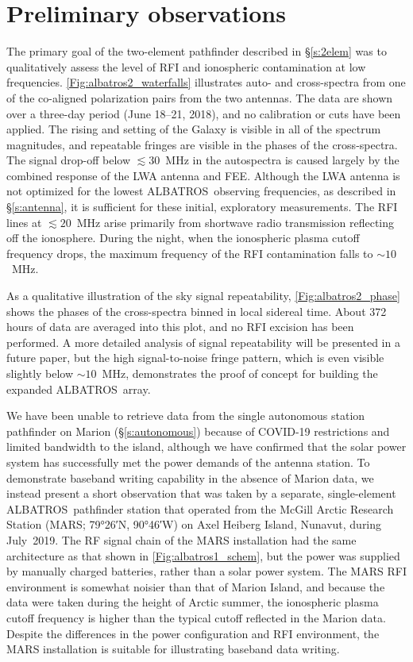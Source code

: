 \documentclass{ws-jai}
\def\albatros{ALBATROS}
\begin{document}
\section{Preliminary observations}\label{s:obs}

The primary goal of the two-element pathfinder described in
\S\ref{s:2elem} was to qualitatively assess the level of RFI and
ionospheric contamination at low frequencies.
\autoref{Fig:albatros2_waterfalls} illustrates auto- and cross-spectra
from one of the co-aligned polarization pairs from the two antennas.
The data are shown over a three-day period (June 18--21, 2018), and no
calibration or cuts have been applied.  The rising and setting of the
Galaxy is visible in all of the spectrum magnitudes, and repeatable
fringes are visible in the phases of the cross-spectra.  The signal
drop-off below $\lesssim30$~MHz in the autospectra is caused largely
by the combined response of the LWA antenna and FEE.  Although the LWA
antenna is not optimized for the lowest \albatros\ observing
frequencies, as described in \S\ref{s:antenna}, it is sufficient for
these initial, exploratory measurements.  The RFI lines at
$\lesssim20$~MHz arise primarily from shortwave radio transmission
reflecting off the ionosphere.  During the night, when the ionospheric
plasma cutoff frequency drops, the maximum frequency of the RFI
contamination falls to $\sim10$~MHz.

As a qualitative illustration of the sky signal repeatability,
\autoref{Fig:albatros2_phase} shows the phases of the cross-spectra
binned in local sidereal time.  About 372 hours of data are averaged
into this plot, and no RFI excision has been performed.  A more
detailed analysis of signal repeatability will be presented in a
future paper, but the high signal-to-noise fringe pattern, which is
even visible slightly below $\sim10$~MHz, demonstrates the proof of
concept for building the expanded \albatros\ array.

We have been unable to retrieve data from the single autonomous
station pathfinder on Marion (\S\ref{s:autonomous}) because of
COVID-19 restrictions and limited bandwidth to the island, although we
have confirmed that the solar power system has successfully met the
power demands of the antenna station.  To demonstrate baseband writing
capability in the absence of Marion data, we instead present a short
observation that was taken by a separate, single-element
\albatros\ pathfinder station that operated from the McGill Arctic
Research Station (MARS; \ang{79;26;}N, \ang{90;46;}W) on Axel Heiberg
Island, Nunavut, during July~2019.  The RF signal chain of the MARS
installation had the same architecture as that shown in
\autoref{Fig:albatros1_schem}, but the power was supplied by manually
charged batteries, rather than a solar power system.  The MARS RFI
environment is somewhat noisier than that of Marion Island, and
because the data were taken during the height of Arctic summer, the
ionospheric plasma cutoff frequency is higher than the typical cutoff
reflected in the Marion data.  Despite the differences in the power
configuration and RFI environment, the MARS installation is suitable
for illustrating baseband data writing.
\end{document}
